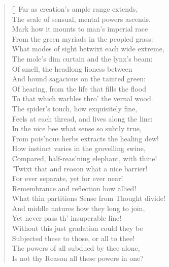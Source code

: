 \begin{verse}[\versewidth]
Far as creation's ample range extends,\\
The scale of sensual, mental powers ascends.\\
Mark how it mounts to man's imperial race\\
From the green myriads in the peopled grass:\\
What modes of sight betwixt each wide extreme,\\
The mole's dim curtain and the lynx's beam:\\
Of smell, the headlong lioness between\\
And hound sagacious on the tainted green:\\
Of hearing, from the life that fills the flood\\
To that which warbles thro' the vernal wood.\\
The spider's touch, how exquisitely fine,\\
Feels at each thread, and lives along the line:\\
In the nice bee what sense so subtly true,\\
From pois'nous herbs extracts the healing dew!\\
How instinct varies in the grovelling swine,\\
Compared, half-reas'ning elephant, with thine!\\
'Twixt that and reason what a nice barrier!\\
For ever separate, yet for ever near!\\
Remembrance and reflection how allied!\\
What thin partitions Sense from Thought divide!\\
And middle natures how they long to join,\\
Yet never pass th' insuperable line!\\
Without this just gradation could they be\\
Subjected these to those, or all to thee!\\
The powers of all subdued by thee alone,\\
Is not thy Reason all these powers in one?


\end{verse}

